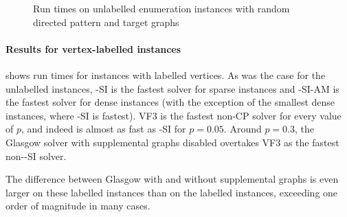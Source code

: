 \begin{figure}[htb]
    \centering
    \caption{Run times on unlabelled enumeration instances with random directed pattern and target graphs}
    \label{figure:unlabelled-vf-instance-runtimes}
\end{figure}

\FloatBarrier

\paragraph*{Results for vertex-labelled instances}

 shows run times for instances with labelled vertices.
As was the case for the unlabelled instances, \McSplit-SI is the fastest solver for sparse instances and \McSplit-SI-AM
is the fastest solver for dense instances (with the exception of the smallest dense instances,
where \McSplit-SI is fastest).  VF3 is the fastest non-CP solver for every value of $p$, and indeed is almost
as fast as \McSplit-SI for $p=0.05$.  Around $p=0.3$, the Glasgow solver
with supplemental graphs disabled overtakes VF3 as the fastest non-\McSplit-SI solver.

The difference between Glasgow with and without supplemental graphs is even larger on these labelled instances
than on the labelled instances, exceeding one order of magnitude in many cases.

